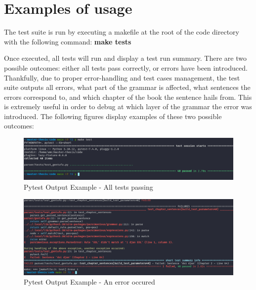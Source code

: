 \newpage

\section{Examples of usage}

The test suite is run by executing a makefile at the root of the code directory with the following command: \textbf{make tests}\newline

Once executed, all tests will run and display a test run summary. There are two possible outcomes: either all tests pass correctly,
or errors have been introduced. Thankfully, due to proper error-handling and test cases management, the test suite outputs all errors,
what part of the grammar is affected, what sentences the errors correspond to,
and which chapter of the book the sentence hails from. This is extremely useful in order to debug at
which layer of the grammar the error was introduced. The following figures display examples of these two possible outcomes:\newline

\begin{figure}[H]
\hspace{-1.1cm}
\includegraphics[scale=0.43]{images/pytest_output_pass.png}
\caption{Pytest Output Example - All tests passing}
\end{figure}

\begin{figure}[H]
\hspace{-2.2cm}
\includegraphics[scale=0.43]{images/pytest_output_fail.png}
\caption{Pytest Output Example - An error occured}
\end{figure}